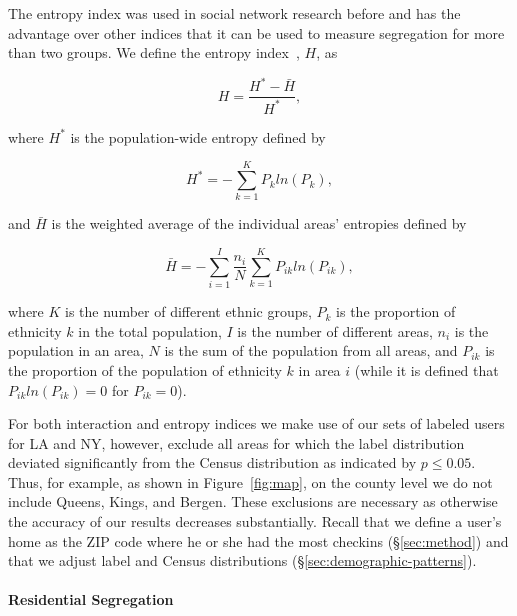 The entropy index was used in social network research before \cite{Cranshaw:2010:BGP:1864349.1864380} and has the advantage over other indices that it can be used to measure segregation for more than two groups. We define the entropy index~\cite{White}, $H$, as

\begin{equation}
\label{entropy1}
	H = \frac{H^* - \bar{H}}{H^*},
\end{equation}

\noindent where $H^*$ is the population-wide entropy defined by

\begin{equation}
\label{entropy2}
	H^* = - \sum\limits_{k=1}^K P_k ln (P_k),
\end{equation}

\noindent and $\bar{H}$ is the weighted average of the individual areas' entropies defined by 

\begin{equation}
\label{entropy3}
	\bar{H} = - \sum\limits_{i=1}^I \frac{n_i}{N} \sum\limits_{k=1}^K P_{ik} ln (P_{ik}),
\end{equation}

\noindent where $K$ is the number of different ethnic groups, $P_k$ is the proportion of ethnicity $k$ in the total population, $I$ is the number of different areas, $n_i$ is the population in an area, $N$ is the sum of the population from all areas, and $P_{ik}$ is the proportion of the population of ethnicity $k$ in area $i$ (while it is defined that $P_{ik} ln (P_{ik}) = 0$ for $P_{ik} = 0$).

For both interaction and entropy indices we make use of our sets of labeled users for LA and NY, however, exclude all areas for which the label distribution deviated significantly from the Census distribution as indicated by $p\leq0.05$. Thus, for example, as shown in Figure~\ref{fig:map}, on the county level we do not include Queens, Kings, and Bergen. These exclusions are necessary as otherwise the accuracy of our results decreases substantially. Recall that we define a user's home as the ZIP code where he or she had the most checkins (\S\ref{sec:method}) and that we adjust label and Census distributions (\S\ref{sec:demographic-patterns}).

\paragraph{Residential Segregation}

